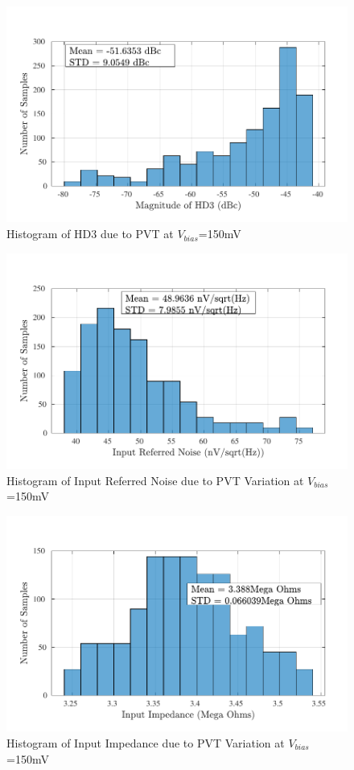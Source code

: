 \begin{figure} [H]
\centering
\includegraphics[scale=1]{Figures/Corners/Overall/PVT_Min/PDFs/PVT_Min_hd3.pdf}
\caption{Histogram of HD3 due to PVT at $V_{bias}$=150mV}
\end{figure}

\begin{figure} [H]
\centering
\includegraphics[scale=1]{Figures/Corners/Overall/PVT_Min/PDFs/PVT_Min_irn.pdf}
\caption{Histogram of Input Referred Noise due to PVT Variation at $V_{bias}$=150mV}
\end{figure}

\begin{figure} [H]
\centering
\includegraphics[scale=1]{Figures/Corners/Overall/PVT_Min/PDFs/PVT_Min_zin.pdf}
\caption{Histogram of Input Impedance due to PVT Variation at $V_{bias}$=150mV}
\end{figure}

